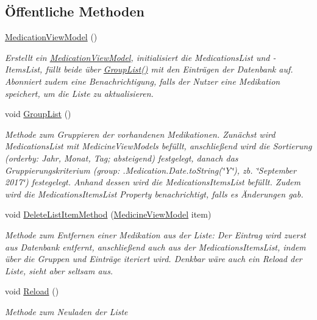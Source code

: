 \subsection*{Öffentliche Methoden}
\begin{DoxyCompactItemize}
\item 
\mbox{\hyperlink{classmy_m_d_1_1_view_model_1_1_medication_tab_view_model_1_1_medication_view_model_adea7437f11fade137b07865f0143d663}{Medication\+View\+Model}} ()
\begin{DoxyCompactList}\small\item\em Erstellt ein \mbox{\hyperlink{classmy_m_d_1_1_view_model_1_1_medication_tab_view_model_1_1_medication_view_model}{Medication\+View\+Model}}, initialisiert die Medications\+List und -\/\+Items\+List, füllt beide über \mbox{\hyperlink{classmy_m_d_1_1_view_model_1_1_medication_tab_view_model_1_1_medication_view_model_a51934d08200971cc38dfaeb26d790620}{Group\+List()}} mit den Einträgen der Datenbank auf. Abonniert zudem eine Benachrichtigung, falls der Nutzer eine Medikation speichert, um die Liste zu aktualisieren. \end{DoxyCompactList}\item 
void \mbox{\hyperlink{classmy_m_d_1_1_view_model_1_1_medication_tab_view_model_1_1_medication_view_model_a51934d08200971cc38dfaeb26d790620}{Group\+List}} ()
\begin{DoxyCompactList}\small\item\em Methode zum Gruppieren der vorhandenen Medikationen. Zunächst wird Medications\+List mit Medicine\+View\+Models befüllt, anschließend wird die Sortierung (orderby\+: Jahr, Monat, Tag; absteigend) festgelegt, danach das Gruppierungskriterium (group\+: .Medication.\+Date.\+to\+String(\char`\"{}\+Y\char`\"{}), zb. \char`\"{}\+September 2017\char`\"{}) festegelegt. Anhand dessen wird die Medications\+Items\+List befüllt. Zudem wird die Medications\+Items\+List Property benachrichtigt, falls es Änderungen gab. \end{DoxyCompactList}\item 
void \mbox{\hyperlink{classmy_m_d_1_1_view_model_1_1_medication_tab_view_model_1_1_medication_view_model_a420091b8fd48e45dddd1d25ca9cc7672}{Delete\+List\+Item\+Method}} (\mbox{\hyperlink{classmy_m_d_1_1_view_model_1_1_medication_tab_view_model_1_1_medicine_view_model}{Medicine\+View\+Model}} item)
\begin{DoxyCompactList}\small\item\em Methode zum Entfernen einer Medikation aus der Liste\+: Der Eintrag wird zuerst aus Datenbank entfernt, anschließend auch aus der Medications\+Items\+List, indem über die Gruppen und Einträge iteriert wird. Denkbar wäre auch ein Reload der Liste, sieht aber seltsam aus. \end{DoxyCompactList}\item 
void \mbox{\hyperlink{classmy_m_d_1_1_view_model_1_1_medication_tab_view_model_1_1_medication_view_model_ae864883a931be2827039bc0d3dcf88f0}{Reload}} ()
\begin{DoxyCompactList}\small\item\em Methode zum Neuladen der Liste \end{DoxyCompactList}\end{DoxyCompactItemize}
